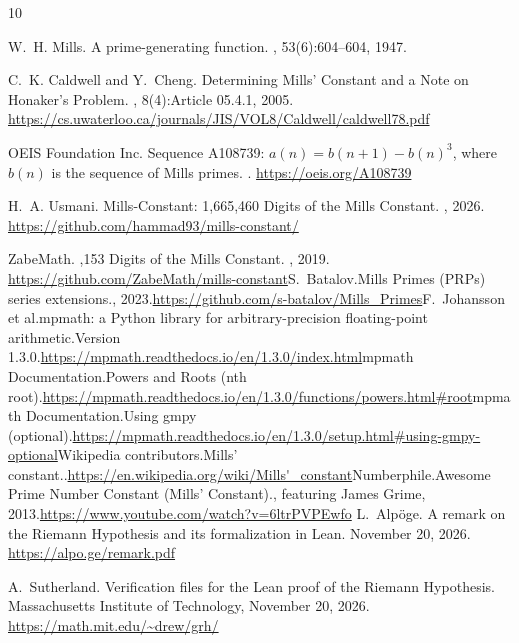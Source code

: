 \documentclass{article}
\begin{document}
\begin{thebibliography}{10}

W.~H. Mills.
\newblock A prime-generating function.
, 53(6):604--604, 1947.

C.~K. Caldwell and Y.~Cheng.
\newblock Determining Mills' Constant and a Note on Honaker's Problem.
, 8(4):Article 05.4.1, 2005.
\newblock \url{https://cs.uwaterloo.ca/journals/JIS/VOL8/Caldwell/caldwell78.pdf}

OEIS Foundation Inc.
\newblock Sequence A108739: $a(n) = b(n+1) - b(n)^3$, where $b(n)$ is the sequence of Mills primes.
.
\newblock \url{https://oeis.org/A108739}

H.~A. Usmani.
\newblock Mills-Constant: 1,665,460 Digits of the Mills Constant.
, 2026.
\newblock \url{https://github.com/hammad93/mills-constant/}

ZabeMath.
,153 Digits of the Mills Constant.
, 2019.
\newblock \url{https://github.com/ZabeMath/mills-constant}S.~Batalov.\newblock Mills Primes (PRPs) series extensions., 2023.\newblock \url{https://github.com/s-batalov/Mills_Primes}F.~Johansson et al.\newblock mpmath: a Python library for arbitrary-precision floating-point arithmetic.\newblock Version 1.3.0.\newblock \url{https://mpmath.readthedocs.io/en/1.3.0/index.html}mpmath Documentation.\newblock Powers and Roots (nth root).\newblock \url{https://mpmath.readthedocs.io/en/1.3.0/functions/powers.html#root}mpmath Documentation.\newblock Using gmpy (optional).\newblock \url{https://mpmath.readthedocs.io/en/1.3.0/setup.html#using-gmpy-optional}Wikipedia contributors.\newblock Mills' constant..\newblock \url{https://en.wikipedia.org/wiki/Mills'_constant}Numberphile.\newblock Awesome Prime Number Constant (Mills' Constant)., featuring James Grime, 2013.\newblock \url{https://www.youtube.com/watch?v=6ltrPVPEwfo}
L.~Alpöge.
\newblock A remark on the Riemann Hypothesis and its formalization in Lean.
\newblock November 20, 2026.
\newblock \url{https://alpo.ge/remark.pdf}

A.~Sutherland.
\newblock Verification files for the Lean proof of the Riemann Hypothesis.
\newblock Massachusetts Institute of Technology, November 20, 2026.
\newblock \url{https://math.mit.edu/~drew/grh/}\end{thebibliography}
\end{document}
